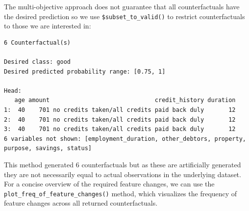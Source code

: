 \begin{Shaded}
\begin{Highlighting}[]
\OtherTok{=}\SpecialCharTok{$} \NormalTok{, }
   \NormalTok{)}
\OtherTok{=}\SpecialCharTok{$}
   \NormalTok{, } \NormalTok{(}\NormalTok{, }\NormalTok{))}
\end{Highlighting}
\end{Shaded}

The multi-objective approach does not guarantee that all counterfactuals
have the desired prediction so we use \texttt{\$subset\_to\_valid()} to
restrict counterfactuals to those we are interested in:

\begin{Shaded}
\begin{Highlighting}[]
\SpecialCharTok{$}\NormalTok{()}
\end{Highlighting}
\end{Shaded}

\begin{verbatim}
6 Counterfactual(s) 
 
Desired class: good 
Desired predicted probability range: [0.75, 1] 
 
Head: 
   age amount                              credit_history duration
1:  40    701 no credits taken/all credits paid back duly       12
2:  40    701 no credits taken/all credits paid back duly       12
3:  40    701 no credits taken/all credits paid back duly       12
6 variables not shown: [employment_duration, other_debtors, property, purpose, savings, status]
\end{verbatim}

This method generated 6 counterfactuals but as these are artificially
generated they are not necessarily equal to actual observations in the
underlying dataset. For a concise overview of the required feature
changes, we can use the \texttt{plot\_freq\_of\_feature\_changes()}
method, which visualizes the frequency of feature changes across all
returned counterfactuals.

\begin{Shaded}
\begin{Highlighting}[]
\SpecialCharTok{$}\NormalTok{()}
\end{Highlighting}
\end{Shaded}

